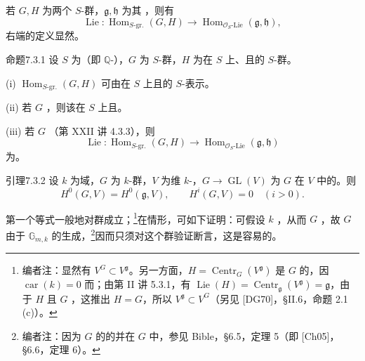 若 $G,H$ 为两个 $S$-群，$\mathfrak g,\mathfrak h$ 为其 ，则有
\[\operatorname{Lie}:\operatorname{Hom}_{S\text{-gr.}}(G,H)\longrightarrow\operatorname{Hom}_{\mathscr O_S\text{-Lie}}(\mathfrak g,\mathfrak h),\]
右端的定义显然。
\begin{SGAresult}{命题}{7.3.1}
设 $S$ 为（即 $\mathbb Q$-），$G$ 为 $S$-群，$H$ 为在 $S$ 上、且的 $S$-群。

(i) $\operatorname{Hom}_{S\text{-gr.}}(G,H)$ 可由在 $S$ 上且的 $S$-表示。

(ii) 若 $G$ ，则该在 $S$ 上且。

(iii) 若 $G$ （第 XXII 讲 4.3.3），则
\[\operatorname{Lie}:\operatorname{Hom}_{S\text{-gr.}}(G,H)\longrightarrow\operatorname{Hom}_{\mathscr O_S\text{-Lie}}(\mathfrak g,\mathfrak h)\]
为。
\end{SGAresult}
\begin{SGAresult}{引理}{7.3.2}
设 $k$ 为域，$G$ 为 $k$-群，$V$ 为维 $k$-，$G\to\operatorname{GL}(V)$ 为 $G$ 在 $V$ 中的。则
\[H^0(G,V)=H^0(\mathfrak g,V),\qquad H^i(G,V)=0\quad(i>0).\]
\end{SGAresult}
第一个等式一般地对群成立；\footnote{编者注：显然有 $V^G\subset V^{\mathfrak g}$。另一方面，$H=\operatorname{Centr}_G(V^{\mathfrak g})$ 是 $G$ 的，因 $\operatorname{car}(k)=0$ 而；由第 II 讲 5.3.1，有 $\operatorname{Lie}(H)=\operatorname{Centr}_{\mathfrak g}(V^{\mathfrak g})=\mathfrak g$，由于 $H$ 且 $G$ ，这推出 $H=G$，所以 $V^{\mathfrak g}\subset V^G$（另见 [DG70]，\S II.6，命题 2.1 (c)）。}在情形，可如下证明：可假设 $k$ ，从而 $G$ ，故 $G$ 由于 $\mathbb G_{m,k}$ 的生成，\footnote{编者注：因为 $G$ 的的并在 $G$ 中，参见 Bible，\S 6.5，定理 5（即 [Ch05]，\S 6.6，定理 6）。}因而只须对这个群验证断言，这是容易的。
